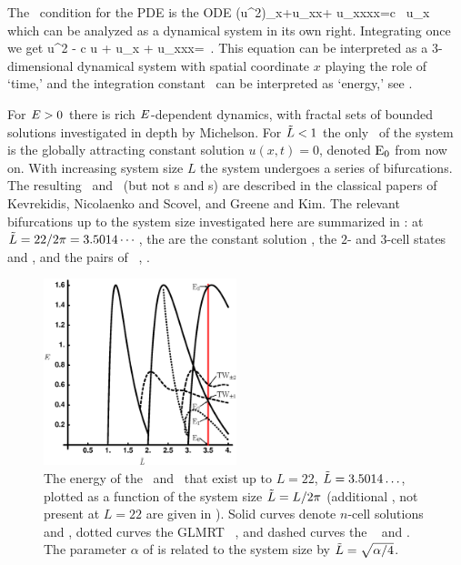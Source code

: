 The \reqv\ condition for the {\KS} PDE 
is the ODE
\beq
{\textstyle{}}(u^2)_x+u_{xx}+ u_{xxxx}=c \, u_x
which can be analyzed as a dynamical system in its own right.
Integrating once we get
\beq
{\textstyle{}}u^2 - c u + u_x + u_{xxx}=\expctE
\,.
\label{eq:stdks}
\eeq
This equation can be interpreted as a 3-dimen\-si\-on\-al dynamical system
with spatial coordinate $x$ playing the role of `time,'
and the integration constant \expctE\ can be interpreted as `energy,'
see .

For $E>0$ there is rich $E$-dependent dynamics,
with fractal sets of bounded solutions investigated in depth
by Michelson. For $\tilde{L}<1$ the only \eqv\ of the
system is the globally attracting constant solution
$u(x,t)=0$, denoted $\mathrm{E}_{0}$ from now on. With increasing
system size $L$ the system undergoes a series of
bifurcations. The resulting \eqva\ and \reqva\ (but not \po s
and \rpo s) are described in the classical papers of
Kevrekidis, Nicolaenko and Scovel, and Greene and
Kim. The relevant bifurcations up to the
system size investigated here are summarized in
: at $\tilde{L}=22/2\pi = 3.5014\cdots$,
the {\eqva} are the constant solution ,
the $2$- and $3$-cell states
 and , and the pairs of \reqva\ ,
.

\begin{figure}[t]       \label{fig:ksBifDiag}
\begin{center}
\includegraphics[width=0.5\textwidth]{figs/ksBifDiag_pst.eps}
\end{center}
\caption{
The energy  of the \eqva\ and \reqva\ that
exist up to $L=22$, $\tilde{L} = 3.5014\ldots$, plotted as a function
of the system size $\tilde{L} = L/2\pi$ (additional \eqva, not present
at $L = 22$ are given in ). Solid curves denote
$n$-cell solutions  and , dotted curves the GLMRT
\eqv\ ,
and dashed curves the \reqva\  and .
The parameter $\alpha$ of  is
related to the system size by $\tilde{L}=\sqrt{\alpha/4}$.
        }
\end{figure}

